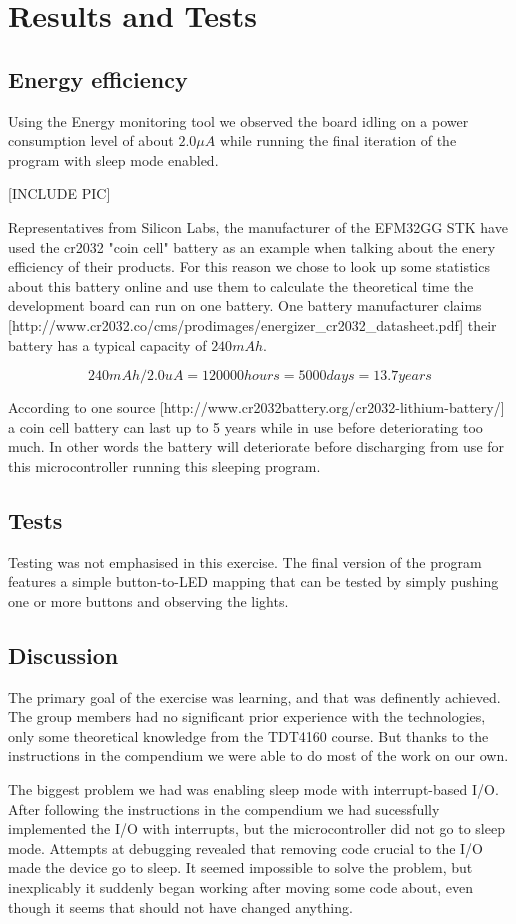 \chapter{Results and Tests}
\label{chap:results}

\section{Energy efficiency}
Using the Energy monitoring tool we observed the board idling on a power consumption level of about $2.0 \mu A$ while running the final iteration of the program with sleep mode enabled.

[INCLUDE PIC]

Representatives from Silicon Labs, the manufacturer of the EFM32GG STK have used the cr2032 "coin cell" battery as an example when talking about the enery efficiency of their products. For this reason we chose to look up some statistics about this battery online and use them to calculate the theoretical time the development board can run on one battery. One battery manufacturer claims [http://www.cr2032.co/cms/prodimages/energizer\_cr2032\_datasheet.pdf] their battery has a typical capacity of $240 mAh$.

\[
	240 mAh / 2.0 uA = 120 000 hours = 5000 days = 13.7 years
\]

According to one source [http://www.cr2032battery.org/cr2032-lithium-battery/] a coin cell battery can last up to 5 years while in use before deteriorating too much. In other words the battery will deteriorate before discharging from use for this microcontroller running this sleeping program.

\section{Tests}
Testing was not emphasised in this exercise. The final version of the program features a simple button-to-LED mapping that can be tested by simply pushing one or more buttons and observing the lights.

\section{Discussion}
The primary goal of the exercise was learning, and that was definently achieved. The group members had no significant prior experience with the technologies, only some theoretical knowledge from the TDT4160 course. But thanks to the instructions in the compendium we were able to do most of the work on our own.

The biggest problem we had was enabling sleep mode with interrupt-based I/O. After following the instructions in the compendium we had sucessfully implemented the I/O with interrupts, but the microcontroller did not go to sleep mode. Attempts at debugging revealed that removing code crucial to the I/O made the device go to sleep. It seemed impossible to solve the problem, but inexplicably it suddenly began working after moving some code about, even though it seems that should not have changed anything.
